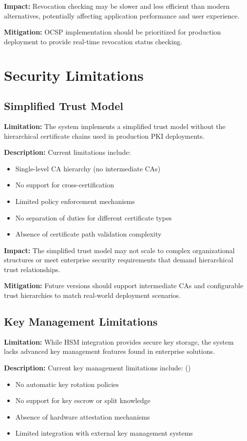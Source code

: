 \textbf{Impact:} Revocation checking may be slower and less efficient than modern alternatives, potentially affecting application performance and user experience.

\textbf{Mitigation:} OCSP implementation should be prioritized for production deployment to provide real-time revocation status checking.

\section{Security Limitations}

\subsection{Simplified Trust Model}

\textbf{Limitation:} The system implements a simplified trust model without the hierarchical certificate chains used in production PKI deployments.

\textbf{Description:} Current limitations include:
\begin{itemize}
    \item Single-level CA hierarchy (no intermediate CAs)
    \item No support for cross-certification
    \item Limited policy enforcement mechanisms
    \item No separation of duties for different certificate types
    \item Absence of certificate path validation complexity
\end{itemize}

\textbf{Impact:} The simplified trust model may not scale to complex organizational structures or meet enterprise security requirements that demand hierarchical trust relationships.

\textbf{Mitigation:} Future versions should support intermediate CAs and configurable trust hierarchies to match real-world deployment scenarios.

\subsection{Key Management Limitations}

\textbf{Limitation:} While HSM integration provides secure key storage, the system lacks advanced key management features found in enterprise solutions.

\textbf{Description:} Current key management limitations include: ({\color{red}{TODO: Check}})
\begin{itemize}
    \item No automatic key rotation policies 
    \item No support for key escrow or split knowledge
    \item Absence of hardware attestation mechanisms
    \item Limited integration with external key management systems
\end{itemize}

